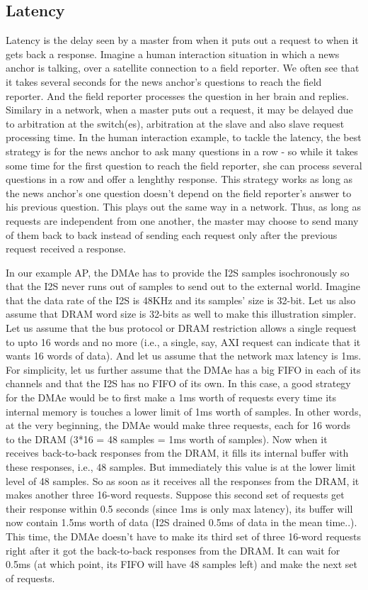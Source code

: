 \subsection{Latency}
Latency is the delay seen by a master from when it puts out a request to when it gets back a response. Imagine a human interaction situation in which a news anchor is talking, over a satellite connection to a field reporter. We often see that it takes several seconds for the news anchor's questions to reach the field reporter. And the field reporter processes the question in her brain and replies. Similary in a network, when a master puts out a request, it may be delayed due to arbitration at the switch(es), arbitration at the slave and also slave request processing time. In the human interaction example, to tackle the latency, the best strategy is for the news anchor to ask many questions in a row - so while it takes some time for the first question to reach the field reporter, she can process several questions in a row and offer a lenghthy response. This strategy works as long as the news anchor's one question doesn't depend on the field reporter's answer to his previous question. This plays out the same way in a network. Thus, as long as requests are independent from one another, the master may choose to send many of them back to back instead of sending each request only after the previous request received a response. 

In our example AP, the DMAe has to provide the I2S samples isochronously so that the I2S never runs out of samples to send out to the external world. Imagine that the data rate of the I2S is 48KHz and its samples' size is 32-bit. Let us also assume that DRAM word size is 32-bits as well to make this illustration simpler. Let us assume that the bus protocol or DRAM restriction allows a single request to upto 16 words and no more (i.e., a single, say, AXI request can indicate that it wants 16 words of data). And let us assume that the network max latency is 1ms. For simplicity, let us further assume that the DMAe has a big FIFO in each of its channels and that the I2S has no FIFO of its own. In this case, a good strategy for the DMAe would be to first make a 1ms worth of requests every time its internal memory is touches a lower limit of 1ms worth of samples. In other words, at the very beginning, the DMAe would make three requests, each for 16 words to the DRAM (3*16 = 48 samples = 1ms worth of samples). Now when it receives back-to-back responses from the DRAM, it fills its internal buffer with these responses, i.e., 48 samples. But immediately this value is at the lower limit level of 48 samples. So as soon as it receives all the responses from the DRAM, it makes another three 16-word requests. Suppose this second set of requests get their response within 0.5 seconds (since 1ms is only max latency), its buffer will now contain 1.5ms worth of data (I2S drained 0.5ms of data in the mean time..). This time, the DMAe doesn't have to make its third set of three 16-word requests right after it got the back-to-back responses from the DRAM. It can wait for 0.5ms (at which point, its FIFO will have 48 samples left) and make the next set of requests. 

